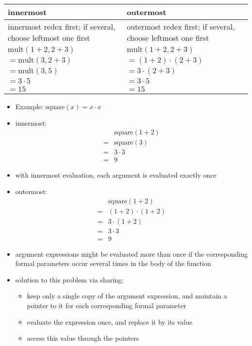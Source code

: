 \begin{multicols}{2}
\begin{tabularx}{\linewidth}{|X|X|}
  \hline
  \textbf{innermost} & \textbf{outermost}\\
  \hline
  innermost redex first; if several, choose leftmost one first & outermost redex first; if several, choose leftmost one first\\
  \hline
  $\text{mult}(1 + 2, 2 + 3)$ & $\text{mult}(1 + 2, 2 + 3)$\\
  $= \text{mult}(3, 2 + 3)$ & $= (1 + 2) \cdot (2 + 3)$\\
  $= \text{mult}(3, 5)$ & $= 3 \cdot (2 + 3)$\\
  $= 3 \cdot 5$ & $= 3 \cdot 5$\\
  $= 15$ & $= 15$\\
  \hline
\end{tabularx}
\begin{itemize}
  \item Example: $\text{square}(x) = x \cdot x$
  \item innermost:
  \begin{align*}
    &\text{square}(1 + 2)\\
    =&\text{square}(3)\\
    =&3 \cdot 3\\
    =&9
  \end{align*}
  \item with innermost evaluation, each argument is evaluated exactly once
  \item outermost:
  \begin{align*}
    &\text{square}(1 + 2)\\
    =&(1 + 2) \cdot (1 + 2)\\
    =&3 \cdot (1 + 2)\\
    =&3 \cdot 3\\
    =&9
  \end{align*}
  \item argument expressions might be evaluated more than once if the corresponding formal parameters occur several times in the body of the function
  \item solution to this problem via sharing:
  \begin{itemize}
    \item keep only a single copy of the argument expression, and maintain a pointer to it for each corresponding formal parameter
    \item evaluate the expression once, and replace it by its value
    \item access this value through the pointers
  \end{itemize}
\end{itemize}


\end{multicols}
